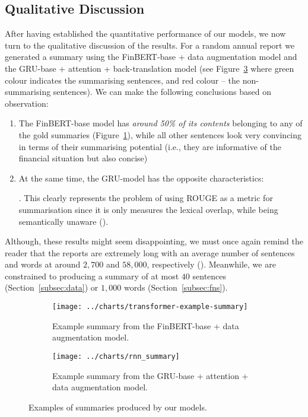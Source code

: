 \subsection{Qualitative Discussion}\label{subsec:qualitative-discussion}
After having established the quantitative performance of our models, we now turn to the qualitative discussion of the results.
For a random annual report we generated a summary using the FinBERT-base + data augmentation model and
the GRU-base + attention + back-translation model (see Figure~\ref{fig:summary_examples}
where green colour indicates the summarising sentences, and red colour -- the non-summarising sentences).
We can make the following conclusions based on observation:
\begin{enumerate}
    \item The FinBERT-base model has \emph{around 50\% of its contents} belonging to any of the gold summaries (Figure~\ref{fig:finbert_summary}),
        while all other sentences look very convincing in terms of their summarising potential (i.e., they are informative of the financial situation but also concise)
    \item At the same time, the GRU-model has the opposite characteristics:
    .
    This clearly represents the problem of using ROUGE as a metric for summarisation since it is only measures the lexical overlap, while being semantically unaware (\cite{akter-etal-2022-revisiting}).
\end{enumerate}
Although, these results might seem disappointing, we must once again remind the reader that the reports are extremely
long with an average number of sentences and words at around $2,700$ and $58,000$, respectively (\cite{litvak-vanetik-2021-summarization}).
Meanwhile, we are constrained to producing a summary of at most $40$ sentences (Section~\ref{subsec:data}) or $1,000$ words (Section~\ref{subsec:fns}).

\begin{figure}[ht]
    \centering
    \begin{subfigure}[t]{0.49\textwidth}
        \centering
        \texttt{[image: ../charts/transformer-example-summary]}
        \caption{Example summary from the FinBERT-base + data augmentation model.}
        \label{fig:finbert_summary}
    \end{subfigure}
    \hfill
    \begin{subfigure}[t]{0.49\textwidth}
        \centering
        \texttt{[image: ../charts/rnn\_summary]}
        \caption{Example summary from the GRU-base + attention + data augmentation model.}
        \label{fig:rnn_summary}
    \end{subfigure}
    \caption{Examples of summaries produced by our models.}
    \label{fig:summary_examples}
\end{figure}


